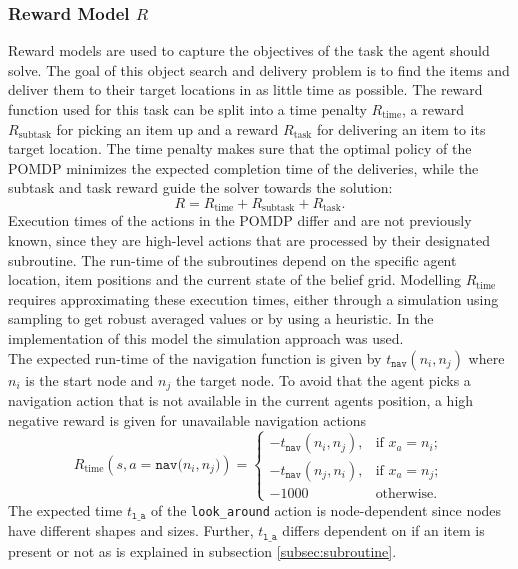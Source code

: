 \subsubsection{Reward Model $R$}
Reward models are used to capture the objectives of the task the agent should solve. The goal of this object search and delivery problem is to find the items and deliver them to their target locations in as little time as possible. The reward function used for this task can be split into a time penalty $R_\text{time}$, a reward  $R_\text{subtask}$ for picking an item up and a reward $R_\text{task}$ for delivering an item to its target location. The time penalty makes sure that the optimal policy of the POMDP minimizes the expected completion time of the deliveries, while the subtask and task reward guide the solver towards the solution:
\begin{equation}
    R = R_{\text{time}} + R_{\text{subtask}} + R_{\text{task}}.
\end{equation}
Execution times of the actions in the POMDP differ and are not previously known, since they are high-level actions that are processed by their designated subroutine. The run-time of the subroutines depend on the specific agent location, item positions and the current state of the belief grid. Modelling $R_\text{time}$ requires approximating these execution times, either through a simulation using sampling to get robust averaged values or by using a heuristic. In the implementation of this model the simulation approach was used.\\
The expected run-time of the navigation function is given by $t_\texttt{nav}(n_i, n_j)$ where $n_i$ is the start node and $n_j$ the target node. To avoid that the agent picks a navigation action that is not available in the current agents position, a high negative reward is given for unavailable navigation actions
\begin{equation}
    R_\text{time}(s, a=\texttt{nav($n_i, n_j$)}) = \begin{cases}
    -t_\texttt{nav}(n_i, n_j), & \text{if } x_a=n_i;\\
    -t_\texttt{nav}(n_j, n_i), & \text{if } x_a=n_j;\\
    -1000 & \text{otherwise}.
    \end{cases}
\end{equation}
The expected time $t_\texttt{l\_a}$ of the \texttt{look\_around} action is node-dependent since nodes have different shapes and sizes. Further, $t_\texttt{l\_a}$ differs dependent on if an item is present or not as is explained in subsection \ref{subsec:subroutine}. 
